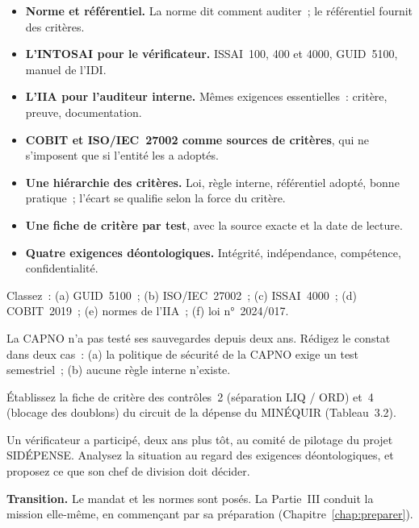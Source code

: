 \begin{boxresume}
\begin{itemize}
    \item \textbf{Norme et référentiel.} La norme dit comment auditer~; le
          référentiel fournit des critères.
    \item \textbf{L'INTOSAI pour le vérificateur.} ISSAI~100, 400 et 4000,
          GUID~5100, manuel de l'IDI.
    \item \textbf{L'IIA pour l'auditeur interne.} Mêmes exigences
          essentielles~: critère, preuve, documentation.
    \item \textbf{COBIT et ISO/IEC~27002 comme sources de critères}, qui ne
          s'imposent que si l'entité les a adoptés.
    \item \textbf{Une hiérarchie des critères.} Loi, règle interne,
          référentiel adopté, bonne pratique~; l'écart se qualifie selon la
          force du critère.
    \item \textbf{Une fiche de critère par test}, avec la source exacte et la
          date de lecture.
    \item \textbf{Quatre exigences déontologiques.} Intégrité,
          indépendance, compétence, confidentialité.
\end{itemize}
\end{boxresume}

\begin{boxexo}[title={\ding{45}\quad Exercice~5.1. Norme ou référentiel~? \niveaubase}]
Classez~: (a) GUID~5100~; (b) ISO/IEC~27002~; (c) ISSAI~4000~; (d) COBIT~2019~;
(e) normes de l'IIA~; (f) loi n°~2024/017.
\end{boxexo}

\begin{boxexo}[title={\ding{45}\quad Exercice~5.2. Qualifier l'écart \niveaumoyen}]
La CAPNO n'a pas testé ses sauvegardes depuis deux ans. Rédigez le
constat dans deux cas~: (a) la politique de sécurité de la CAPNO exige un
test semestriel~; (b) aucune règle interne n'existe.
\end{boxexo}

\begin{boxexo}[title={\ding{45}\quad Exercice~5.3. Fiches de critère \niveaumoyen}]
Établissez la fiche de critère des contrôles~2 (séparation LIQ / ORD) et~4
(blocage des doublons) du circuit de la dépense du MINÉQUIR
(Tableau~3.2).
\end{boxexo}

\begin{boxexo}[title={\ding{45}\quad Exercice~5.4. Un conflit d'intérêts \niveauexpert}]
Un vérificateur a participé, deux ans plus tôt, au comité de pilotage du
projet SIDÉPENSE. Analysez la situation au regard des exigences
déontologiques, et proposez ce que son chef de division doit décider.
\end{boxexo}

\begin{boxinfo}
\textbf{Transition.} Le mandat et les normes sont posés. La Partie~III
conduit la mission elle-même, en commençant par sa préparation
(Chapitre~\ref{chap:preparer}).
\end{boxinfo}
